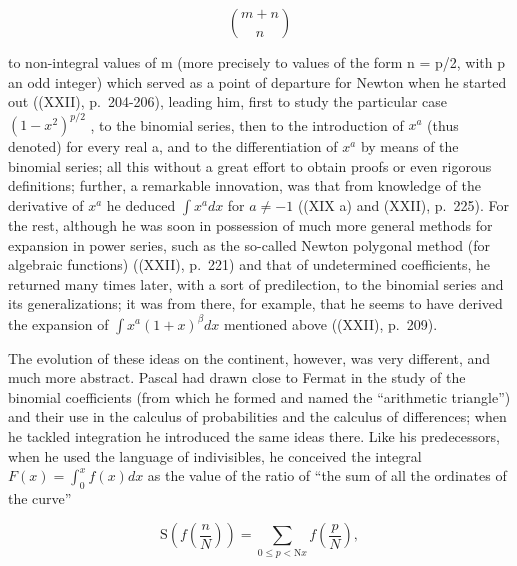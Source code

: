 \[
\binom{m + n}{n}
\]

to non-integral values of m (more precisely to values of the form n = p/2, with p an odd integer) which served as a point of departure for Newton when he started out ((XXII), p.~204-206), leading him, first to study the particular case \((1 - x^{2})^{p/2}\) , to the binomial series, then to the introduction of \(x^{a}\) (thus denoted) for every real a, and to the differentiation of \(x^{a}\) by means of the binomial series; all this without a great effort to obtain proofs or even rigorous definitions; further, a remarkable innovation, was that from knowledge of the derivative of \(x^{a}\) he deduced \(\int x^{a} dx\) for \(a \neq -1\) ((XIX a) and (XXII), p.~225). For the rest, although he was soon in possession of much more general methods for expansion in power series, such as the so-called Newton polygonal method (for algebraic functions) ((XXII), p.~221) and that of undetermined coefficients, he returned many times later, with a sort of predilection, to the binomial series and its generalizations; it was from there, for example, that he seems to have derived the expansion of \(\int x^{a}(1 + x)^{\beta} dx\) mentioned above ((XXII), p.~209).

The evolution of these ideas on the continent, however, was very different, and much more abstract. Pascal had drawn close to Fermat in the study of the binomial coefficients (from which he formed and named the ``arithmetic triangle'') and their use in the calculus of probabilities and the calculus of differences; when he tackled integration he introduced the same ideas there. Like his predecessors, when he used the language of indivisibles, he conceived the integral \(F(x) = \int_{0}^{x} f(x) dx\) as the value of the ratio of ``the sum of all the ordinates of the curve''

\[
\mathrm{S} \left(f \left(\frac {n}{N}\right)\right) = \sum_ {0 \leqslant p <   \mathrm{N} x} f \left(\frac {p}{N}\right),
\]

